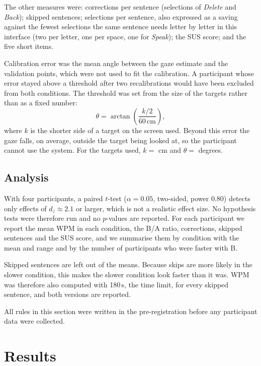 The other measures were: corrections per sentence (selections of \emph{Delete} and \emph{Back}); skipped
sentences; selections per sentence, also expressed as a saving against the fewest selections the same
sentence needs letter by letter in this interface (two per letter, one per space, one for \emph{Speak});
the SUS score; and the five short items.

Calibration error was the mean angle between the gaze estimate and the validation points, which were
not used to fit the calibration. A participant whose error stayed above a threshold after two
recalibrations would have been excluded from both conditions. The threshold was set from the size of the
targets rather than as a fixed number:
\begin{equation}
  \theta = \arctan\!\left(\frac{k/2}{60\,\mathrm{cm}}\right),
\end{equation}
where $k$ is the shorter side of a target on the screen used. Beyond this error the gaze falls, on
average, outside the target being looked at, so the participant cannot use the system.
For the targets used, $k = $  cm and $\theta = $ \todo{$\theta$} degrees.

\subsection{Analysis}
\label{sec:b-analysis}

With four participants, a paired $t$-test ($\alpha = 0.05$, two-sided, power 0.80) detects only effects
of $d_z \approx 2.1$ or larger, which is not a realistic effect size. No hypothesis tests were therefore
run and no $p$-values are reported. For each participant we report the mean WPM in each condition, the
B/A ratio, corrections, skipped sentences and the SUS score, and we summarise them by condition with the
mean and range and by the number of participants who were faster with B.

Skipped sentences are left out of the means. Because skips are more likely in the slower condition,
this makes the slower condition look faster than it was. WPM was therefore also computed with
180\,s, the time limit, for every skipped sentence, and both versions are reported.

All rules in this section were written in the pre-registration before any participant data were
collected.

\section{Results}
\label{sec:b-results}


